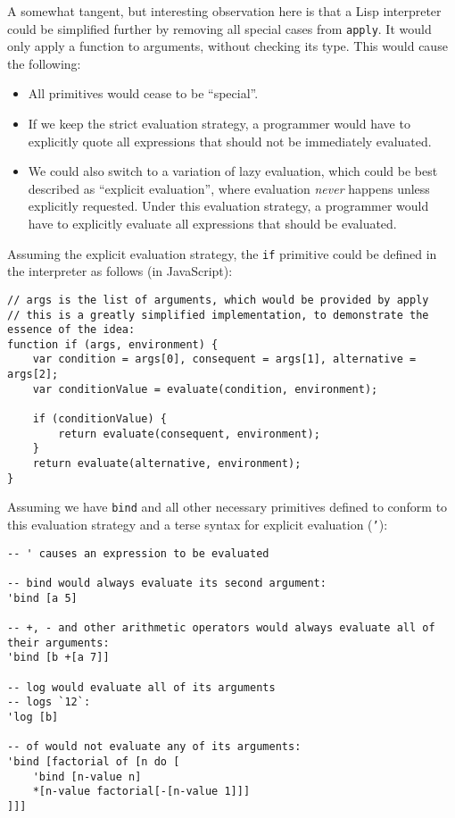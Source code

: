 A somewhat tangent, but interesting observation here is that a Lisp interpreter could be simplified further by removing all special cases from \texttt{apply}. It would only apply a function to arguments, without checking its type. This would cause the following:
\begin{itemize}
	\item All primitives would cease to be ``special''. 
	\item If we keep the strict evaluation strategy, a programmer would have to explicitly quote all expressions that should not be immediately evaluated.
	\item We could also switch to a variation of lazy evaluation, which could be best described as ``explicit evaluation'', where evaluation \textit{never} happens unless explicitly requested. Under this evaluation strategy, a programmer would have to explicitly evaluate all expressions that should be evaluated.
\end{itemize}

Assuming the explicit evaluation strategy, the \texttt{if} primitive could be defined in the interpreter as follows (in JavaScript):
\begin{lstlisting}
// args is the list of arguments, which would be provided by apply
// this is a greatly simplified implementation, to demonstrate the essence of the idea:
function if (args, environment) {
	var condition = args[0], consequent = args[1], alternative = args[2];
	var conditionValue = evaluate(condition, environment);
	
	if (conditionValue) {
		return evaluate(consequent, environment);
	}
	return evaluate(alternative, environment);
}
\end{lstlisting}

Assuming we have \texttt{bind} and all other necessary primitives defined to conform to this evaluation strategy and a terse syntax for explicit evaluation (\texttt{'}):
\begin{lstlisting}
-- ' causes an expression to be evaluated

-- bind would always evaluate its second argument:
'bind [a 5]

-- +, - and other arithmetic operators would always evaluate all of their arguments:
'bind [b +[a 7]]

-- log would evaluate all of its arguments
-- logs `12`:
'log [b]

-- of would not evaluate any of its arguments:
'bind [factorial of [n do [
	'bind [n-value n]
	*[n-value factorial[-[n-value 1]]]
]]]
\end{lstlisting}

